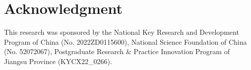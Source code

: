 \documentclass[a4paper]{cas-sc}
\begin{document}

\printcredits

\section*{Acknowledgment}

This research was sponsored by the National Key Research and Development Program of China (No. 2022ZD0115600),
 National Science Foundation of China (No. 52072067), Postgraduate Research \& Practice Innovation Program of Jiangsu Province (KYCX22\_0266).

% 





\end{document}
